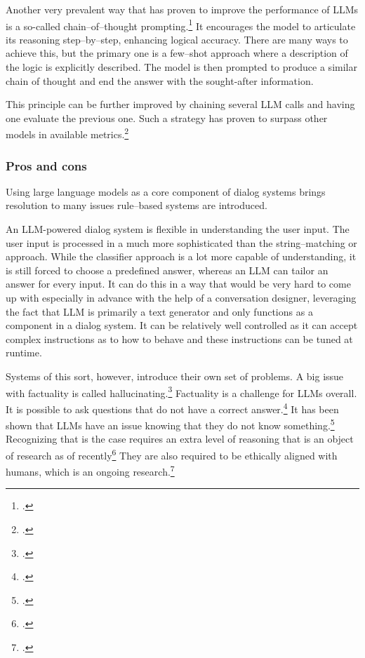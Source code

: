 \documentclass[12pt]{report}
\begin{document}
{Another very prevalent way that has proven to
improve the performance of LLMs is a so-called
chain–of–thought prompting.\footcite{wei2022chain}
It encourages the model to
articulate its reasoning step–by–step,
enhancing logical accuracy.
There are many ways to achieve this,
but the primary one is a few–shot approach
where a description of the logic is
explicitly described.
The model is then prompted to produce
a similar chain of thought
and end the answer with the sought-after information.

This principle can be further improved by
chaining several LLM calls and having one
evaluate the previous one.
Such a strategy has proven to surpass other models
in available metrics.\footcite{wu2024comparative}

\subsubsection{Pros and cons}

Using large language models as a core component
of dialog systems brings resolution to many issues
rule–based systems are introduced.

An LLM-powered dialog system is flexible in understanding
the user input.
The user input is processed in a much more sophisticated
than the string–matching or approach.
While the classifier approach is a lot more capable of understanding,
it is still forced to choose a predefined answer, whereas
an LLM can tailor an answer for every input.
It can do this in a way that would be very hard to come up with
especially in advance with the help of a conversation designer,
leveraging the fact that LLM is primarily a text generator
and only functions as a component in a dialog system.
It can be relatively well controlled as
it can accept complex instructions as to how to behave
and these instructions can be tuned at runtime.

Systems of this sort, however, introduce their own set of problems.
A big issue with factuality is called hallucinating.\footcite{bruno2023insights, perkovic2024hallucinations}
Factuality is a challenge for LLMs overall.
It is possible to ask questions
that do not have a correct answer.\footcite{payandeh2023susceptible}
It has been shown that LLMs have an issue
knowing that they do not know something.\footcite{yin2023large}
Recognizing that is the case requires
an extra level of reasoning
that is an object of research as of recently\footcite{transformer_circuits_2024}
They are also required to be ethically aligned with humans, which is an ongoing research.\footcite{wang2024comprehensive}

}
\end{document}
